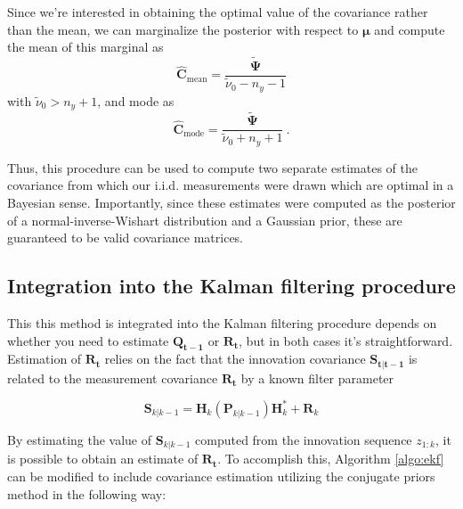 \documentclass[11pt]{article}
\newcounter{algo}
\begin{document}
\noindent Since we're interested in obtaining the optimal value of the covariance rather than the mean, we can marginalize the posterior with respect to $\mathbf{\mu}$ and compute the mean of this marginal as
\begin{equation}\label{eq:Cmean}
	\hat{\mathbf{C}}_{\textrm{mean}} = \frac{\tilde{\bm{\Psi}}}{\tilde{\nu}_0 - n_y - 1}
\end{equation}
\noindent with $\tilde{\nu}_0 > n_y + 1$, and mode as
\begin{equation}\label{eq:Cmode}
	\hat{\mathbf{C}}_{\textrm{mode}} = \frac{\tilde{\bm{\Psi}}}{\tilde{\nu}_0 + n_y + 1} ~.
\end{equation} 

\noindent Thus, this procedure can be used to compute two separate estimates of the covariance from which our i.i.d. measurements were drawn which are optimal in a Bayesian sense. Importantly, since these estimates were computed as the posterior of a normal-inverse-Wishart distribution and a Gaussian prior, these are guaranteed to be valid covariance matrices.

\subsection{Integration into the Kalman filtering procedure}

This this method is integrated into the Kalman filtering procedure depends on whether you need to estimate $\mathbf{Q_{t-1}}$ or $\mathbf{R_{t}}$, but in both cases it's straightforward. Estimation of $\mathbf{R_{t}}$ relies on the fact that the innovation covariance $\mathbf{S_{t|t-1}}$ is related to the measurement covariance $\mathbf{R_{t}}$ by a known filter parameter

\begin{equation}\label{eq:Cinnov}
\mathbf{S}_{k|k-1} = \mathbf{H}_{k}(\mathbf{P}_{k|k-1})\mathbf{H}_{k}^* + \mathbf{R}_{k}
\end{equation}

\noindent By estimating the value of $\mathbf{S}_{k|k-1}$ computed from the innovation sequence $z_{1:k}$, it is possible to obtain an estimate of $\mathbf{R_{t}}$. To accomplish this, Algorithm \ref{algo:ekf} can be modified to include covariance estimation utilizing the conjugate priors method in the following way:
\end{document}
